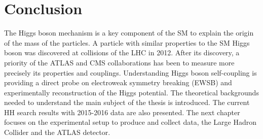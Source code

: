 
\section{Conclusion}
\label{chap1:Conc}
The Higgs boson mechanism is a key component of the SM to explain the origin of the mass of the particles. A particle with similar properties to the SM Higgs boson was discovered at collisions of the LHC in 2012. After its discovery, a priority of the ATLAS and CMS collaborations has been to measure more precisely its properties and couplings. Understanding Higgs boson self-coupling is providing a direct probe on electroweak symmetry breaking (EWSB) and experimentally reconstruction of the Higgs potential. The theoretical backgrounds needed to understand the main subject of the thesis is introduced. The current HH search results with 2015-2016 data are also presented. %
The next chapter focuses on the experimental setup to produce and collect data, the Large Hadron Collider and the ATLAS detector. 

